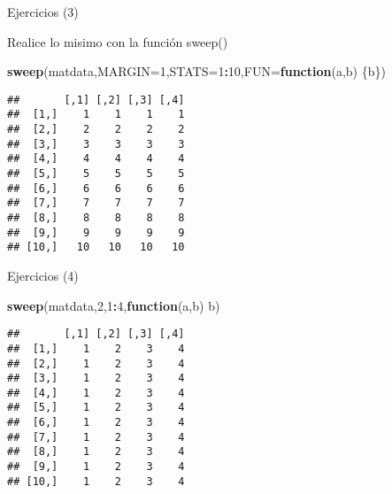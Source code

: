 \documentclass[ignorenonframetext,]{beamer}
\newenvironment{Shaded}{\begin{snugshade}}{\end{snugshade}}
\newcommand{\KeywordTok}[1]{\textcolor[rgb]{0.13,0.29,0.53}{\textbf{#1}}}
\newcommand{\DataTypeTok}[1]{\textcolor[rgb]{0.13,0.29,0.53}{#1}}
\newcommand{\DecValTok}[1]{\textcolor[rgb]{0.00,0.00,0.81}{#1}}
\newcommand{\ControlFlowTok}[1]{\textcolor[rgb]{0.13,0.29,0.53}{\textbf{#1}}}
\newcommand{\OperatorTok}[1]{\textcolor[rgb]{0.81,0.36,0.00}{\textbf{#1}}}
\newcommand{\NormalTok}[1]{#1}
\begin{document}
\begin{frame}[fragile]{Ejercicios (3)}

Realice lo misimo con la función sweep()

\begin{Shaded}
\begin{Highlighting}[]
\KeywordTok{sweep}\NormalTok{(matdata,}\DataTypeTok{MARGIN=}\DecValTok{1}\NormalTok{,}\DataTypeTok{STATS=}\DecValTok{1}\OperatorTok{:}\DecValTok{10}\NormalTok{,}\DataTypeTok{FUN=}\ControlFlowTok{function}\NormalTok{(a,b) \{b\})}
\end{Highlighting}
\end{Shaded}

\begin{verbatim}
##       [,1] [,2] [,3] [,4]
##  [1,]    1    1    1    1
##  [2,]    2    2    2    2
##  [3,]    3    3    3    3
##  [4,]    4    4    4    4
##  [5,]    5    5    5    5
##  [6,]    6    6    6    6
##  [7,]    7    7    7    7
##  [8,]    8    8    8    8
##  [9,]    9    9    9    9
## [10,]   10   10   10   10
\end{verbatim}

\end{frame}

\begin{frame}[fragile]{Ejercicios (4)}

\begin{Shaded}
\begin{Highlighting}[]
\KeywordTok{sweep}\NormalTok{(matdata,}\DecValTok{2}\NormalTok{,}\DecValTok{1}\OperatorTok{:}\DecValTok{4}\NormalTok{,}\ControlFlowTok{function}\NormalTok{(a,b) b)}
\end{Highlighting}
\end{Shaded}

\begin{verbatim}
##       [,1] [,2] [,3] [,4]
##  [1,]    1    2    3    4
##  [2,]    1    2    3    4
##  [3,]    1    2    3    4
##  [4,]    1    2    3    4
##  [5,]    1    2    3    4
##  [6,]    1    2    3    4
##  [7,]    1    2    3    4
##  [8,]    1    2    3    4
##  [9,]    1    2    3    4
## [10,]    1    2    3    4
\end{verbatim}

\end{frame}
\end{document}
